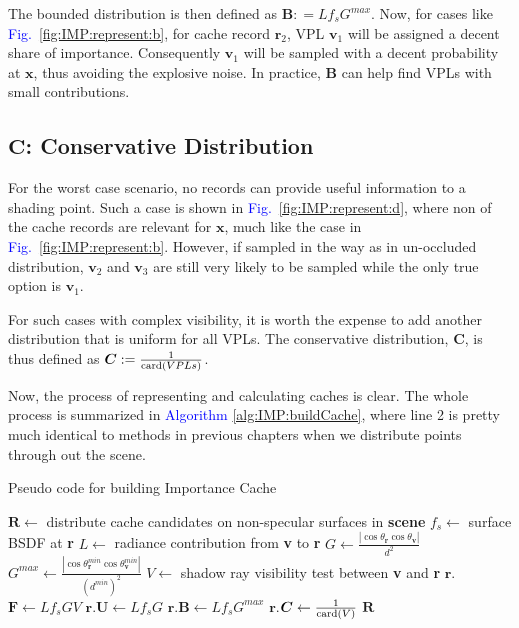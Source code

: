 \documentclass[]{book}
\renewcommand{\figurename}{\textcolor{blue}{Fig.\ }}
\begin{document}
The bounded distribution is then defined as $\boldsymbol{B} \mathrel{{:}{=}} L f_s G^{max}$.
Now, for cases like \figurename \ref{fig:IMP:represent:b}, for cache record $\mathbf{r}_2$, VPL $\mathbf{v}_1$ will be assigned a decent share of importance.
Consequently $\mathbf{v}_1$ will be sampled with a decent probability at $\mathbf{x}$, thus avoiding the explosive noise.
In practice, $\boldsymbol{B}$ can help find VPLs with small contributions.

\subsection{$\boldsymbol{C}$: Conservative Distribution}
\label{sec:imp_cache_represent:C}
For the worst case scenario, no records can provide useful information to a shading point.
Such a case is shown in \figurename \ref{fig:IMP:represent:d}, where non of the cache records are relevant for $\mathbf{x}$, much like the case in \figurename \ref{fig:IMP:represent:b}.
However, if sampled in the way as in un-occluded distribution, $\mathbf{v}_2$ and $\mathbf{v}_3$ are still very likely to be sampled while the only true option is $\mathbf{v}_1$.

For such cases with complex visibility, it is worth the expense to add another distribution that is uniform for all VPLs.
The conservative distribution, $\boldsymbol{C}$, is thus defined as $\boldsymbol{C} \mathrel{{:}{=}} \frac{1}{\textup{card}(VPLs)}$.

Now, the process of representing and calculating caches is clear.
The whole process is summarized in \textcolor{blue}{Algorithm} \ref{alg:IMP:buildCache}, where line 2 is pretty much identical to methods in previous chapters when we distribute points through out the scene.

\begin{algorithm}[b]
\caption[Build Importance Cache]{Pseudo code for building Importance Cache}
\label{alg:IMP:buildCache}
\begin{algorithmic}[1]
		\State $\boldsymbol{R} \gets$ distribute cache candidates on non-specular surfaces in \textbf{scene}
			\State $f_s \gets$ surface BSDF at \textbf{r}
				\State $L\gets$ radiance contribution from \textbf{v} to \textbf{r}
				\State $G\gets \frac{|\cos\theta_{\textbf{r}} \cos\theta_{\textbf{v}}|}{d^2}$
				\State $G^{max}\gets\frac{|\cos\theta_{\textbf{r}}^{min} \cos\theta_{\textbf{v}}^{min}|}{(d^{min})^2}$
				\State $V\gets$ shadow ray visibility test between \textbf{v} and \textbf{r}
				\State $\mathbf{r}$.$\boldsymbol{F} \gets L f_s G V$
				\State $\mathbf{r}$.$\boldsymbol{U} \gets L f_s G$
				\State $\mathbf{r}$.$\boldsymbol{B} \gets L f_s G^{max}$
				\State $\mathbf{r}$.$\boldsymbol{C} \gets \frac{1}{\textup{card}(V)}$
			\EndFor
		\EndFor
		\State \Return $\boldsymbol{R}$
	\EndProcedure
\end{algorithmic}
\end{algorithm}
\end{document}
